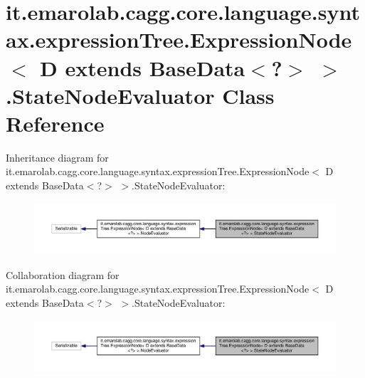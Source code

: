 \hypertarget{classit_1_1emarolab_1_1cagg_1_1core_1_1language_1_1syntax_1_1expressionTree_1_1ExpressionNode_3_98df205ce8da64f1ea3f26a27a596721}{\section{it.\-emarolab.\-cagg.\-core.\-language.\-syntax.\-expression\-Tree.\-Expression\-Node$<$ D extends Base\-Data$<$?$>$ $>$.State\-Node\-Evaluator Class Reference}
\label{classit_1_1emarolab_1_1cagg_1_1core_1_1language_1_1syntax_1_1expressionTree_1_1ExpressionNode_3_98df205ce8da64f1ea3f26a27a596721}
}


Inheritance diagram for it.\-emarolab.\-cagg.\-core.\-language.\-syntax.\-expression\-Tree.\-Expression\-Node$<$ D extends Base\-Data$<$?$>$ $>$.State\-Node\-Evaluator\-:\nopagebreak
\begin{figure}[H]
\begin{center}
\leavevmode
\includegraphics[width=350pt]{classit_1_1emarolab_1_1cagg_1_1core_1_1language_1_1syntax_1_1expressionTree_1_1ExpressionNode_3_d500f0da93dce3c6cabcf8b2c43bf2aa}
\end{center}
\end{figure}


Collaboration diagram for it.\-emarolab.\-cagg.\-core.\-language.\-syntax.\-expression\-Tree.\-Expression\-Node$<$ D extends Base\-Data$<$?$>$ $>$.State\-Node\-Evaluator\-:\nopagebreak
\begin{figure}[H]
\begin{center}
\leavevmode
\includegraphics[width=350pt]{classit_1_1emarolab_1_1cagg_1_1core_1_1language_1_1syntax_1_1expressionTree_1_1ExpressionNode_3_33dd63a8dc0c41179bc903c7f5b106da}
\end{center}
\end{figure}
